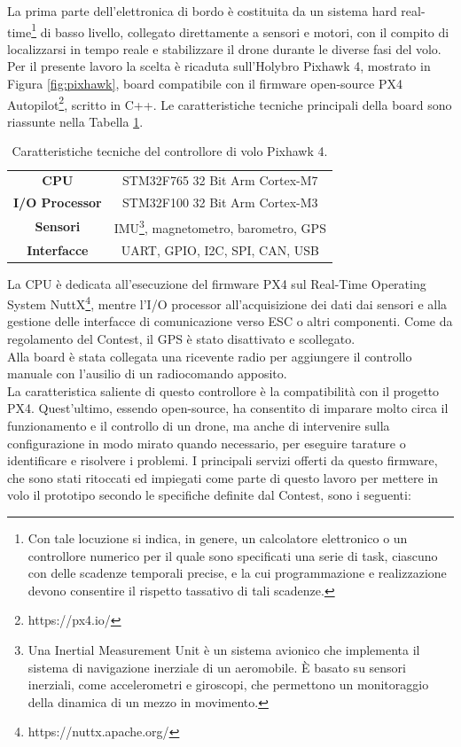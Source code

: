 \indent La prima parte dell'elettronica di bordo è costituita da un sistema hard real-time\footnote{Con tale locuzione si indica, in genere, un calcolatore elettronico o un controllore numerico per il quale sono specificati una serie di task, ciascuno con delle scadenze temporali precise, e la cui programmazione e realizzazione devono consentire il rispetto tassativo di tali scadenze.} di basso livello, collegato direttamente a sensori e motori, con il compito di localizzarsi in tempo reale e stabilizzare il drone durante le diverse fasi del volo. Per il presente lavoro la scelta è ricaduta sull'Holybro Pixhawk 4, mostrato in Figura \ref{fig:pixhawk}, board compatibile con il firmware open-source PX4 Autopilot\footnote{https://px4.io/}, scritto in C++. Le caratteristiche tecniche principali della board sono riassunte nella Tabella \ref{tab:pix}.\\
\begin{table}
    \centering
    \begin{tabular}{c|c}
        \textbf{CPU} & STM32F765 32 Bit Arm Cortex-M7 \\
        \textbf{I/O Processor} & STM32F100 32 Bit Arm Cortex-M3 \\
        \textbf{Sensori} & IMU\footnote{Una Inertial Measurement Unit è un sistema avionico che implementa il sistema di navigazione inerziale di un aeromobile. È basato su sensori inerziali, come accelerometri e giroscopi, che permettono un monitoraggio della dinamica di un mezzo in movimento.}, magnetometro, barometro, GPS\\
        \textbf{Interfacce} & UART, GPIO, I2C, SPI, CAN, USB
    \end{tabular}
    \caption{Caratteristiche tecniche del controllore di volo Pixhawk 4.}
    \label{tab:pix}
\end{table}
La CPU è dedicata all'esecuzione del firmware PX4 sul Real-Time Operating System NuttX\footnote{https://nuttx.apache.org/}, mentre l'I/O processor all'acquisizione dei dati dai sensori e alla gestione delle interfacce di comunicazione verso ESC o altri componenti. Come da regolamento del Contest, il GPS è stato disattivato e scollegato.\\
Alla board è stata collegata una ricevente radio per aggiungere il controllo manuale con l'ausilio di un radiocomando apposito.\\
La caratteristica saliente di questo controllore è la compatibilità con il progetto PX4. Quest'ultimo, essendo open-source, ha consentito di imparare molto circa il funzionamento e il controllo di un drone, ma anche di intervenire sulla configurazione in modo mirato quando necessario, per eseguire tarature o identificare e risolvere i problemi. I principali servizi offerti da questo firmware, che sono stati ritoccati ed impiegati come parte di questo lavoro per mettere in volo il prototipo secondo le specifiche definite dal Contest, sono i seguenti:
